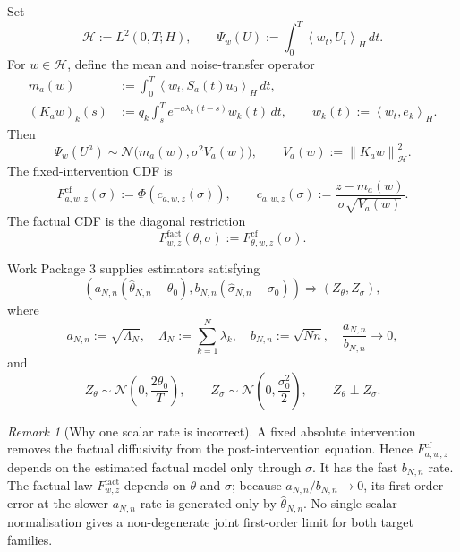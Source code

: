 \documentclass[11pt]{article}
\theoremstyle{remark}
\newtheorem{remark}[assumption]{Remark}
\newcommand{\cf}{\mathrm{cf}}
\newcommand{\fact}{\mathrm{fact}}
\newcommand{\cH}{\mathcal H}
\newcommand{\norm}[1]{\left\lVert #1\right\rVert}
\newcommand{\ip}[2]{\left\langle #1,#2\right\rangle}
\newcommand{\Ph}{\Phi}
\newcommand{\LamN}{\Lambda_N}
\newcommand{\an}{a_{N,n}}
\newcommand{\bn}{b_{N,n}}
\newcommand{\thetahat}{\widehat\theta_{N,n}}
\newcommand{\sigmahat}{\widehat\sigma_{N,n}}
\begin{document}
Set
\[
 \cH:=L^2(0,T;H),
 \qquad
 \Psi_w(U):=\int_0^T\ip{w_t}{U_t}_H\,dt.
\]
For $w\in\cH$, define the mean and noise-transfer operator
\begin{align}
 m_a(w)
 &:=\int_0^T\ip{w_t}{S_a(t)u_0}_H\,dt,\label{eq:mean}\\
 (K_aw)_k(s)
 &:=q_k\int_s^T e^{-a\lambda_k(t-s)}w_k(t)\,dt,
 \qquad w_k(t):=\ip{w_t}{e_k}_H.\label{eq:K}
\end{align}
Then
\begin{equation}\label{eq:law}
 \Psi_w(U^a)\sim
 \mathcal N\big(m_a(w),\sigma^2V_a(w)\big),
 \qquad
 V_a(w):=\norm{K_aw}_{\cH}^2.
\end{equation}
The fixed-intervention CDF is
\begin{equation}\label{eq:Fcf}
 F^{\cf}_{a,w,z}(\sigma)
 :=\Ph\!\left(c_{a,w,z}(\sigma)\right),
 \qquad
 c_{a,w,z}(\sigma)
 :=\frac{z-m_a(w)}{\sigma\sqrt{V_a(w)}}.
\end{equation}
The factual CDF is the diagonal restriction
\begin{equation}\label{eq:Ffact}
 F^{\fact}_{w,z}(\theta,\sigma)
 :=F^{\cf}_{\theta,w,z}(\sigma).
\end{equation}

Work Package 3 supplies estimators satisfying
\begin{equation}\label{eq:mixed-clt}
 \left(
 \an(\thetahat-\theta_0),
 \bn(\sigmahat-\sigma_0)
 \right)
 \Rightarrow
 (Z_\theta,Z_\sigma),
\end{equation}
where
\begin{equation}\label{eq:rates}
 \an:=\sqrt{\LamN},
 \quad
 \LamN:=\sum_{k=1}^N\lambda_k,
 \quad
 \bn:=\sqrt{Nn},
 \quad
 \frac{\an}{\bn}\to0,
\end{equation}
and
\begin{equation}\label{eq:limit-Z}
 Z_\theta\sim\mathcal N\!\left(0,\frac{2\theta_0}{T}\right),
 \qquad
 Z_\sigma\sim\mathcal N\!\left(0,\frac{\sigma_0^2}{2}\right),
 \qquad Z_\theta\perp Z_\sigma.
\end{equation}

\begin{remark}[Why one scalar rate is incorrect]\label{rem:no-common-rate}
A fixed absolute intervention removes the factual diffusivity from the post-intervention equation.  Hence $F^{\cf}_{a,w,z}$ depends on the estimated factual model only through $\sigma$.  It has the fast $\bn$ rate.  The factual law $F^{\fact}_{w,z}$ depends on $\theta$ and $\sigma$; because $\an/\bn\to0$, its first-order error at the slower $\an$ rate is generated only by $\thetahat$.  No single scalar normalisation gives a non-degenerate joint first-order limit for both target families.
\end{remark}
\end{document}

